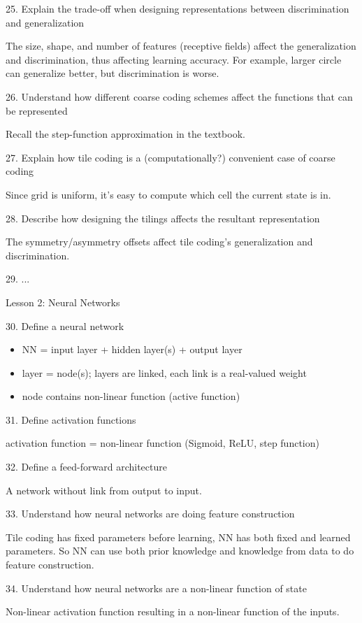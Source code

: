 \documentclass[sutton_barto_notes.tex]{subfiles}
\begin{document}
25. Explain the trade-off when designing representations between discrimination and generalization 

The size, shape, and number of features (receptive fields) affect the generalization and discrimination, thus affecting learning accuracy.
For example, larger circle can generalize better, but discrimination is   worse.

26. Understand how different coarse coding schemes affect the functions that can be represented 

Recall the step-function approximation in the textbook.

27. Explain how tile coding is a (computationally?) convenient case of coarse coding 

Since grid is uniform, it's easy to compute which cell the current state is in.

28. Describe how designing the tilings affects the resultant representation 

The symmetry/asymmetry offsets affect tile coding's generalization and discrimination.

29. ...

Lesson 2: Neural Networks 

30. Define a neural network

\begin{itemize}
\item NN = input layer + hidden layer(s) + output layer
\item layer = node(s); layers are linked, each link is a real-valued weight
\item node contains non-linear function (active function)
\end{itemize}

31. Define activation functions

activation function = non-linear function (Sigmoid, ReLU, step function)

32. Define a feed-forward architecture 

A network without link from output to input.

33. Understand how neural networks are doing feature construction 

Tile coding has fixed parameters before learning, NN has both fixed and learned parameters. So NN can use both prior knowledge and knowledge from data to do feature construction.

34. Understand how neural networks are a non-linear function of state 

Non-linear activation function resulting in a non-linear function of the inputs.
\end{document}
